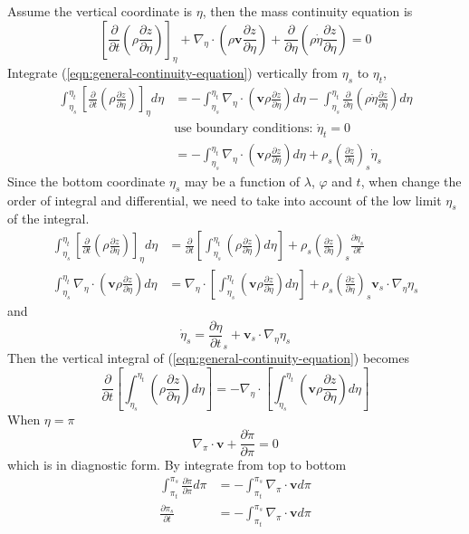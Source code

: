 \documentclass[12pt]{article}
\newcommand{\pd}[2]{\frac{\partial #1}{\partial #2}}
\newcommand{\pdt}[1]{\pd{#1}{t}}
\newcommand{\pdz}[1]{\pd{#1}{\pi}}
\renewcommand{\vec}[1]{\mathbf{#1}}
\newcommand{\grad}[2][\pi]{\nabla_{#1} #2}
\renewcommand{\div}[2][\pi]{\nabla_{#1} \cdot #2}
\begin{document}
Assume the vertical coordinate is $\eta$, then the mass continuity equation is
\begin{equation}
  \left[\pdt{} \left(\rho \pd{z}{\eta}\right)\right]_\eta + \div[\eta]{\left(\rho \vec{v} \pd{z}{\eta}\right)} + \pd{}{\eta} \left(\rho \dot{\eta} \pd{z}{\eta}\right) = 0
  \label{eqn:general-continuity-equation}
\end{equation}
Integrate (\ref{eqn:general-continuity-equation}) vertically from $\eta_s$ to $\eta_t$,
\begin{align*}
  \int_{\eta_s}^{\eta_t} \left[\pdt{} \left(\rho \pd{z}{\eta}\right)\right]_\eta d\eta & = - \int_{\eta_s}^{\eta_t} \div[\eta]{\left(\vec{v} \rho \pd{z}{\eta}\right)} d\eta - \int_{\eta_s}^{\eta_t} \pd{}{\eta} \left(\rho \dot{\eta} \pd{z}{\eta}\right) d\eta \\
  & \text{use boundary conditions: } \dot{\eta}_t = 0 \\
  & = - \int_{\eta_s}^{\eta_t} \div[\eta]{\left(\vec{v} \rho \pd{z}{\eta}\right)} d\eta + \rho_s \left(\pd{z}{\eta}\right)_s \dot{\eta}_s
\end{align*}
Since the bottom coordinate $\eta_s$ may be a function of $\lambda$, $\varphi$ and $t$, when change the order of integral and differential, we need to take into account of the low limit $\eta_s$ of the integral.
\begin{align*}
  \int_{\eta_s}^{\eta_t} \left[\pdt{} \left(\rho \pd{z}{\eta}\right)\right]_\eta d\eta & = \pdt{} \left[\int_{\eta_s}^{\eta_t} \left(\rho \pd{z}{\eta}\right) d\eta\right] + \rho_s \left(\pd{z}{\eta}\right)_s \pdt{\eta_s} \\
  \int_{\eta_s}^{\eta_t} \div[\eta]{\left(\vec{v} \rho \pd{z}{\eta}\right)} d\eta & = \div[\eta]{\left[\int_{\eta_s}^{\eta_t} \left(\vec{v} \rho \pd{z}{\eta}\right) d\eta\right]} + \rho_s \left(\pd{z}{\eta}\right)_s \vec{v}_s \cdot \grad[\eta]{\eta_s}
\end{align*}
and
\begin{equation}
  \dot{\eta}_s = \pdt{\eta}_s + \vec{v}_s \cdot \grad[\eta]{\eta_s}
\end{equation}
Then the vertical integral of (\ref{eqn:general-continuity-equation}) becomes
\begin{equation}
  \pdt{} \left[\int_{\eta_s}^{\eta_t} \left(\rho \pd{z}{\eta}\right) d\eta\right] = - \div[\eta]{\left[\int_{\eta_s}^{\eta_t} \left(\vec{v} \rho \pd{z}{\eta}\right) d\eta\right]}
\end{equation}
When $\eta = \pi$
\begin{equation}
  \div{\vec{v}} + \pd{\dot{\pi}}{\pi} = 0 \label{eqn:incompressible-continuity-equation}
\end{equation}
which is in diagnostic form. By integrate from top to bottom
\begin{align*}
  \int_{\pi_t}^{\pi_s} \pdz{\dot{\pi}} d \pi & = - \int_{\pi_t}^{\pi_s} \div{\vec{v}} d \pi \\
  \pdt{\pi_s} & = - \int_{\pi_t}^{\pi_s} \div{\vec{v}} d \pi
\end{align*}
\end{document}
